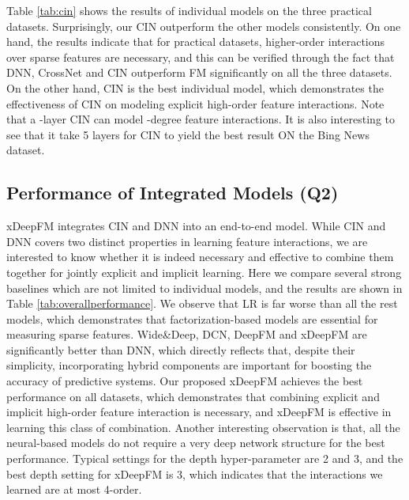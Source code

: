  \indent Table \ref{tab:cin} shows the results of individual models on the three practical datasets. Surprisingly, our CIN outperform the other models consistently. On one hand, the results indicate that for practical datasets, higher-order interactions over sparse features are necessary, and this can be verified through the fact that DNN, CrossNet and CIN outperform FM significantly on all the three datasets.  On the other hand, CIN is the best individual model, which demonstrates the effectiveness of CIN on modeling explicit high-order feature interactions. Note that a -layer CIN can model -degree feature interactions. It is also interesting to see that it take 5 layers for CIN to yield the best result ON the Bing News dataset.
\subsection{Performance of Integrated Models (Q2)}
xDeepFM integrates CIN and DNN into an end-to-end model. While CIN and DNN covers two distinct properties in learning feature interactions, we are interested to know whether it is indeed necessary and effective to combine them together for jointly explicit and implicit learning. Here we compare several strong baselines which are not limited to individual models, and the results are shown in Table \ref{tab:overallperformance}. We observe that LR is far worse than all the rest models, which demonstrates that factorization-based models are essential for measuring sparse features. Wide\&Deep, DCN, DeepFM and xDeepFM are significantly better than DNN, which directly reflects that,  despite their simplicity, incorporating hybrid components are important for boosting the accuracy of predictive systems. Our proposed xDeepFM achieves the best performance on all datasets, which demonstrates that combining explicit and implicit high-order feature interaction is necessary, and xDeepFM is effective in learning this class of combination. Another interesting observation is that, all the neural-based models do not require a very deep network structure for the best performance. Typical settings for the depth hyper-parameter are 2 and 3, and the best depth setting for xDeepFM is 3, which indicates that the interactions we learned are at most 4-order.
